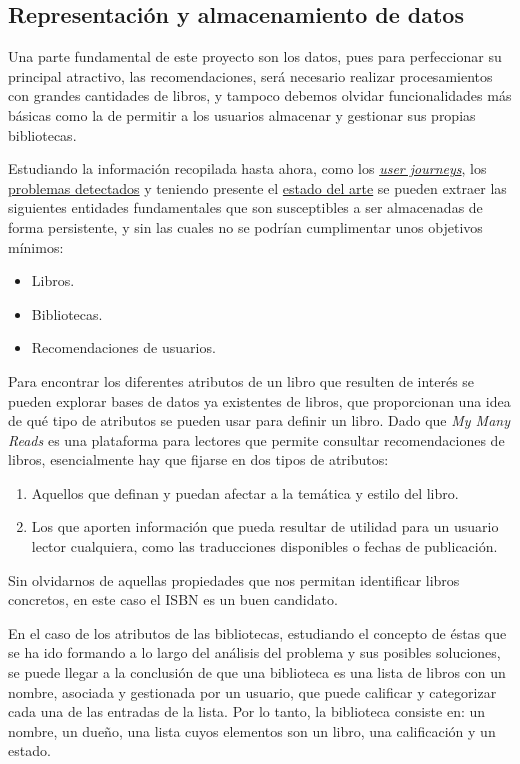\subsection{Representación y almacenamiento de datos}

Una parte fundamental de este proyecto son los datos, pues para perfeccionar su principal atractivo, las recomendaciones, será necesario realizar procesamientos con grandes cantidades de libros, y tampoco debemos olvidar funcionalidades más básicas como la de permitir a los usuarios almacenar y gestionar sus propias bibliotecas.

Estudiando la información recopilada hasta ahora, como los \hyperref[user journeys]{\textit{user journeys}}, los \hyperref[problemas de los usuarios]{problemas detectados} y teniendo presente el \hyperref[Estado del arte]{estado del arte} se pueden extraer las siguientes entidades fundamentales que son susceptibles a ser almacenadas de forma persistente, y sin las cuales no se podrían cumplimentar unos objetivos mínimos:

\begin{itemize}
    \item Libros.
    \item Bibliotecas.
    \item Recomendaciones de usuarios.
\end{itemize}

Para encontrar los diferentes atributos de un libro que resulten de interés se pueden explorar bases de datos ya existentes de libros, que proporcionan una idea de qué tipo de atributos se pueden usar para definir un libro. Dado que \textit{My Many Reads} es una plataforma para lectores que permite consultar recomendaciones de libros, esencialmente hay que fijarse en dos tipos de atributos: 

\begin{enumerate}
    \item Aquellos que definan y puedan afectar a la temática y estilo del libro.
    \item Los que aporten información que pueda resultar de utilidad para un usuario lector cualquiera, como las traducciones disponibles o fechas de publicación.
\end{enumerate}

Sin olvidarnos de aquellas propiedades que nos permitan identificar libros concretos, en este caso el ISBN es un buen candidato.

En el caso de los atributos de las bibliotecas, estudiando el concepto de éstas que se ha ido formando a lo largo del análisis del problema y sus posibles soluciones, se puede llegar a la conclusión de que una biblioteca es una lista de libros con un nombre, asociada y gestionada por un usuario, que puede calificar y categorizar cada una de las entradas de la lista. Por lo tanto, la biblioteca consiste en: un nombre, un dueño, una lista cuyos elementos son un libro, una calificación y un estado.

